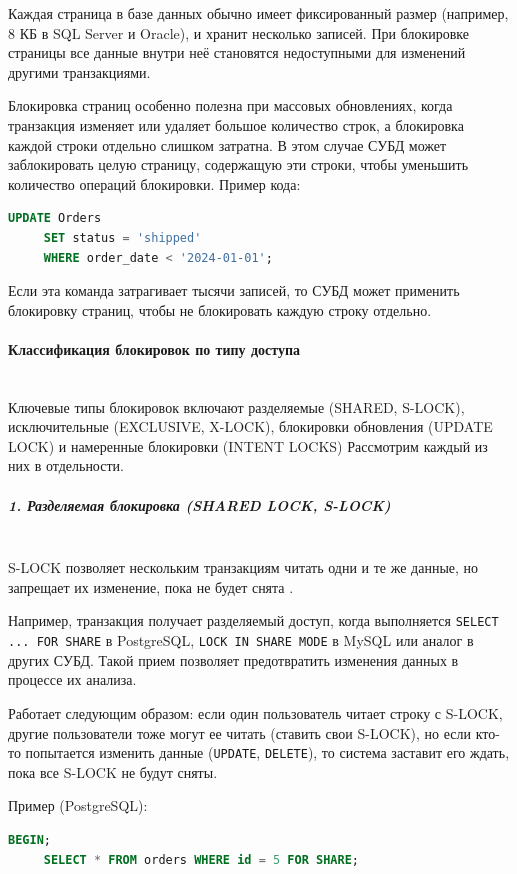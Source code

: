  Каждая страница в базе данных обычно имеет фиксированный размер (например, 8 КБ в SQL Server и Oracle), и хранит несколько записей. При блокировке страницы все данные внутри неё становятся недоступными для изменений другими транзакциями.
 
 Блокировка страниц особенно полезна при массовых обновлениях, когда транзакция изменяет или удаляет большое количество строк, а блокировка каждой строки отдельно слишком затратна. В этом случае СУБД может заблокировать целую страницу, содержащую эти строки, чтобы уменьшить количество операций блокировки.
 Пример кода:
 \begin{lstlisting}[language=SQL]
     UPDATE Orders
     SET status = 'shipped' 
     WHERE order_date < '2024-01-01';
 \end{lstlisting}

 Если эта команда затрагивает тысячи записей, то СУБД может применить блокировку страниц, чтобы не блокировать каждую строку отдельно.
 
 \paragraph{Классификация блокировок по типу доступа} ~\\
 
 Ключевые типы блокировок включают разделяемые (SHARED, S-LOCK), исключительные (EXCLUSIVE, X-LOCK), блокировки обновления (UPDATE LOCK) и намеренные блокировки (INTENT LOCKS)
 Рассмотрим каждый из них в отдельности.
 
 \subparagraph{1. Разделяемая блокировка (SHARED LOCK, S-LOCK)} ~\\

 S-LOCK позволяет нескольким транзакциям читать одни и те же данные, но запрещает их изменение, пока не будет снята \autocite{ElmasriNavathe}.

 Например, транзакция получает разделяемый доступ, когда выполняется \texttt{SELECT ... FOR SHARE} в PostgreSQL, \texttt{LOCK IN SHARE MODE} в MySQL или аналог в других СУБД.
 Такой прием позволяет предотвратить изменения данных в процессе их анализа.
 
 Работает следующим образом: если один пользователь читает строку с S-LOCK, другие пользователи тоже могут ее читать (ставить свои S-LOCK), но если кто-то попытается изменить данные (\texttt{UPDATE}, \texttt{DELETE}), то система заставит его ждать, пока все S-LOCK не будут сняты.
 
 Пример (PostgreSQL):
 \begin{lstlisting}[language=SQL]
     BEGIN;
     SELECT * FROM orders WHERE id = 5 FOR SHARE;    
 \end{lstlisting}


